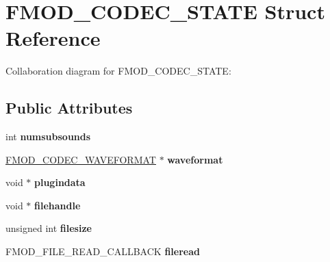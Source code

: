 \hypertarget{struct_f_m_o_d___c_o_d_e_c___s_t_a_t_e}{\section{F\+M\+O\+D\+\_\+\+C\+O\+D\+E\+C\+\_\+\+S\+T\+A\+T\+E Struct Reference}
\label{struct_f_m_o_d___c_o_d_e_c___s_t_a_t_e}
}


Collaboration diagram for F\+M\+O\+D\+\_\+\+C\+O\+D\+E\+C\+\_\+\+S\+T\+A\+T\+E\+:
\subsection*{Public Attributes}
\begin{DoxyCompactItemize}
\item 
\hypertarget{struct_f_m_o_d___c_o_d_e_c___s_t_a_t_e_af9c17a02d9b967fa0ececf991a654dfd}{int {\bfseries numsubsounds}}\label{struct_f_m_o_d___c_o_d_e_c___s_t_a_t_e_af9c17a02d9b967fa0ececf991a654dfd}

\item 
\hypertarget{struct_f_m_o_d___c_o_d_e_c___s_t_a_t_e_a1223e11dd3ec5e655a88dabd2b8a5b84}{\hyperlink{struct_f_m_o_d___c_o_d_e_c___w_a_v_e_f_o_r_m_a_t}{F\+M\+O\+D\+\_\+\+C\+O\+D\+E\+C\+\_\+\+W\+A\+V\+E\+F\+O\+R\+M\+A\+T} $\ast$ {\bfseries waveformat}}\label{struct_f_m_o_d___c_o_d_e_c___s_t_a_t_e_a1223e11dd3ec5e655a88dabd2b8a5b84}

\item 
\hypertarget{struct_f_m_o_d___c_o_d_e_c___s_t_a_t_e_af92634f543fe55d632f6b4cd325489ce}{void $\ast$ {\bfseries plugindata}}\label{struct_f_m_o_d___c_o_d_e_c___s_t_a_t_e_af92634f543fe55d632f6b4cd325489ce}

\item 
\hypertarget{struct_f_m_o_d___c_o_d_e_c___s_t_a_t_e_a94206a915eec3e91f5ffc61b6d3f1681}{void $\ast$ {\bfseries filehandle}}\label{struct_f_m_o_d___c_o_d_e_c___s_t_a_t_e_a94206a915eec3e91f5ffc61b6d3f1681}

\item 
\hypertarget{struct_f_m_o_d___c_o_d_e_c___s_t_a_t_e_af314546d98e746687bfeaae8a59f792c}{unsigned int {\bfseries filesize}}\label{struct_f_m_o_d___c_o_d_e_c___s_t_a_t_e_af314546d98e746687bfeaae8a59f792c}

\item 
\hypertarget{struct_f_m_o_d___c_o_d_e_c___s_t_a_t_e_a938fd270ea867d6c29c406381793ee6d}{F\+M\+O\+D\+\_\+\+F\+I\+L\+E\+\_\+\+R\+E\+A\+D\+\_\+\+C\+A\+L\+L\+B\+A\+C\+K {\bfseries fileread}}\label{struct_f_m_o_d___c_o_d_e_c___s_t_a_t_e_a938fd270ea867d6c29c406381793ee6d}


\end{DoxyCompactItemize}
